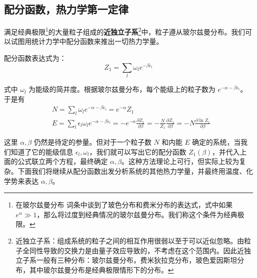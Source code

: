 


\subsection{配分函数，热力学第一定律}

满足经典极限\footnote{在玻尔兹曼分布 词条中谈到了玻色分布和费米分布的表达式，式中如果 $e^\alpha\gg 1$，那么将过度到经典情况的玻尔兹曼分布。我们称这个条件为经典极限。}的大量粒子组成的\textbf{近独立子系}\footnote{近独立子系：组成系统的粒子之间的相互作用很弱以至于可以近似忽略。由粒子全同性导致的交换力是由量子效应导致的，不考虑在这个范围内。因此近独立子系一般有三种分布：玻尔兹曼分布，费米狄拉克分布，玻色爱因斯坦分布，其中玻尔兹曼分布是经典极限情形下的分布。}中，粒子遵从玻尔兹曼分布。我们可以试图用统计力学中配分函数来推出一切热力学量。

配分函数表达式为：
\begin{equation}
Z_1=\sum_l \omega_l e^{-\beta \epsilon_l}
\end{equation}

式中 $\omega_l$ 为能级的简并度。根据玻尔兹曼分布，每个能级上的粒子数为 $e^{-\alpha-\beta\epsilon_l}$。于是有
\begin{equation}\label{eq_TheSta_4}
\begin{aligned}
&N=\sum_l \omega_l e^{-\alpha-\beta\epsilon_l}=e^{-\alpha} Z_1\\
&E=\sum_l \epsilon_l \omega_l e^{-\alpha-\beta\epsilon_l}=-e^{-\alpha}\frac{\partial Z_1}{\partial \beta}=-\frac{N}{Z_1}\frac{\partial Z_1}{\partial \beta}=-N\frac{\partial \ln Z_1}{\partial \beta}
\end{aligned}
\end{equation}

这里 $\alpha,\beta$ 仍然是待定的参量。但对于一个粒子数 $N$ 和内能 $E$ 确定的系统，当我们知道了它的能级信息 $\epsilon_l,\omega_l$，我们就可以写出它的配分函数 $Z_1(\beta)$，并代入上面的公式联立两个方程，最终确定 $\alpha,\beta$。这种方法理论上可行，但实际上较为复杂。下面我们将继续从配分函数出发分析系统的其他热力学量，并最终用温度、化学势来表达 $\alpha,\beta$。
